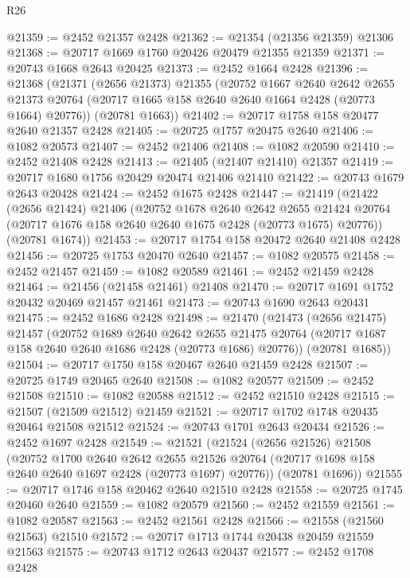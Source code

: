 \begin{lexlean}{R26}
\begin{coremodule}
@21359 := @2452 @21357 @2428
@21362 := @21354 (@21356 @21359) @21306
@21368 := @20717 @1669 @1760 @20426 @20479 @21355 @21359
@21371 := @20743 @1668 @2643 @20425
@21373 := @2452 @1664 @2428
@21396 := @21368
    (@21371
      (@2656 @21373)
      @21355
      (@20752
        @1667
        @2640
        @2642
        @2655
        @21373
        @20764
        (@20717 @1665 @158 @2640 @2640 @1664 @2428 (@20773 @1664) @20776))
      (@20781 @1663))
@21402 := @20717 @1758 @158 @20477 @2640 @21357 @2428
@21405 := @20725 @1757 @20475 @2640
@21406 := @1082 @20573
@21407 := @2452 @21406
@21408 := @1082 @20590
@21410 := @2452 @21408 @2428
@21413 := @21405 (@21407 @21410) @21357
@21419 := @20717 @1680 @1756 @20429 @20474 @21406 @21410
@21422 := @20743 @1679 @2643 @20428
@21424 := @2452 @1675 @2428
@21447 := @21419
    (@21422
      (@2656 @21424)
      @21406
      (@20752
        @1678
        @2640
        @2642
        @2655
        @21424
        @20764
        (@20717 @1676 @158 @2640 @2640 @1675 @2428 (@20773 @1675) @20776))
      (@20781 @1674))
@21453 := @20717 @1754 @158 @20472 @2640 @21408 @2428
@21456 := @20725 @1753 @20470 @2640
@21457 := @1082 @20575
@21458 := @2452 @21457
@21459 := @1082 @20589
@21461 := @2452 @21459 @2428
@21464 := @21456 (@21458 @21461) @21408
@21470 := @20717 @1691 @1752 @20432 @20469 @21457 @21461
@21473 := @20743 @1690 @2643 @20431
@21475 := @2452 @1686 @2428
@21498 := @21470
    (@21473
      (@2656 @21475)
      @21457
      (@20752
        @1689
        @2640
        @2642
        @2655
        @21475
        @20764
        (@20717 @1687 @158 @2640 @2640 @1686 @2428 (@20773 @1686) @20776))
      (@20781 @1685))
@21504 := @20717 @1750 @158 @20467 @2640 @21459 @2428
@21507 := @20725 @1749 @20465 @2640
@21508 := @1082 @20577
@21509 := @2452 @21508
@21510 := @1082 @20588
@21512 := @2452 @21510 @2428
@21515 := @21507 (@21509 @21512) @21459
@21521 := @20717 @1702 @1748 @20435 @20464 @21508 @21512
@21524 := @20743 @1701 @2643 @20434
@21526 := @2452 @1697 @2428
@21549 := @21521
    (@21524
      (@2656 @21526)
      @21508
      (@20752
        @1700
        @2640
        @2642
        @2655
        @21526
        @20764
        (@20717 @1698 @158 @2640 @2640 @1697 @2428 (@20773 @1697) @20776))
      (@20781 @1696))
@21555 := @20717 @1746 @158 @20462 @2640 @21510 @2428
@21558 := @20725 @1745 @20460 @2640
@21559 := @1082 @20579
@21560 := @2452 @21559
@21561 := @1082 @20587
@21563 := @2452 @21561 @2428
@21566 := @21558 (@21560 @21563) @21510
@21572 := @20717 @1713 @1744 @20438 @20459 @21559 @21563
@21575 := @20743 @1712 @2643 @20437
@21577 := @2452 @1708 @2428

\end{coremodule}
\end{lexlean}
